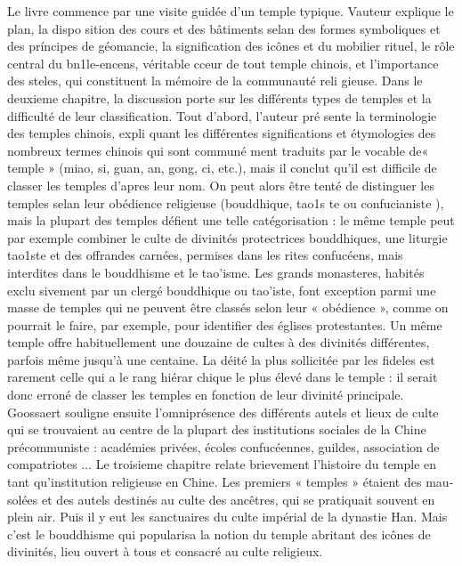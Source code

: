 Le livre commence par une visite guidée d'un temple typique. Vauteur explique le plan, la dispo­ sition des cours et des bâtiments selan des formes symboliques et des príncipes de géomancie, la signification des icônes et du mobilier rituel, le rôle central du bn1le-encens, véritable cceur de tout temple chinois, et l'importance des steles, qui constituent la mémoire de la communauté reli­ gieuse.
Dans le deuxieme chapitre, la discussion porte sur les différents types de temples et la difficulté de leur classification. Tout d'abord, l'auteur pré­ sente la terminologie des temples chinois, expli­ quant les différentes significations et étymologies des nombreux termes chinois qui sont communé­ ment traduits par le vocable de« temple » (miao, si, guan, an, gong, ci, etc.), mais il conclut qu'il est difficile de classer les temples d'apres leur nom. On peut alors être tenté de distinguer les temples selan leur obédience religieuse (bouddhique, tao1s­ te ou confucianiste ), mais la plupart des temples défient une telle catégorisation : le même temple peut par exemple combiner le culte de divinités protectrices bouddhiques, une liturgie tao1ste et des offrandes carnées, permises dans les rites confucéens, mais interdites dans le bouddhisme et
le tao'isme. Les grands monasteres, habités exclu­ sivement par un clergé bouddhique ou tao'iste, font exception parmi une masse de temples qui ne peuvent être classés selon leur « obédience », comme on pourrait le faire, par exemple, pour identifier des églises protestantes. Un même temple offre habituellement une douzaine de cultes à des divinités différentes, parfois même jusqu'à une centaine. La déité la plus sollicitée par les fideles est rarement celle qui a le rang hiérar­ chique le plus élevé dans le temple : il serait donc erroné de classer les temples en fonction de leur divinité principale. Goossaert souligne ensuite l'omniprésence des différents autels et lieux de culte qui se trouvaient au centre de la plupart des institutions sociales de la Chine précommuniste : académies privées, écoles confucéennes, guildes, association de compatriotes ...
Le troisieme chapitre relate brievement l'histoire du temple en tant qu'institution religieuse en Chine. Les premiers « temples » étaient des mau­ solées et des autels destinés au culte des ancêtres, qui se pratiquait souvent en plein air. Puis il y eut les sanctuaires du culte impérial de la dynastie Han. Mais c'est le bouddhisme qui popularisa la notion du temple abritant des icônes de divinités, lieu ouvert à tous et consacré au culte religieux.
